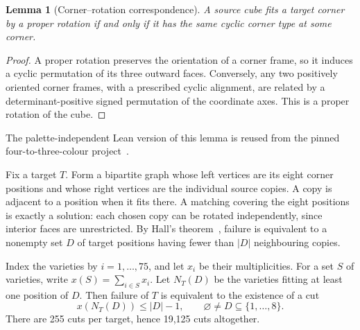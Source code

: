 \documentclass[11pt]{article}
\newtheorem{lemma}[theorem]{Lemma}
\theoremstyle{remark}
\begin{document}
\begin{lemma}[Corner--rotation correspondence]\label{lem:corner}
A source cube fits a target corner by a proper rotation if and only if it
has the same cyclic corner type at some corner.
\end{lemma}
\begin{proof}
A proper rotation preserves the orientation of a corner frame, so it induces
a cyclic permutation of its three outward faces. Conversely, any two
positively oriented corner frames, with a prescribed cyclic alignment,
are related by a determinant-positive signed permutation of the coordinate
axes. This is a proper rotation of the cube.
\end{proof}
The palette-independent Lean version of this lemma is reused from the
pinned four-to-three-colour project~\cite{FourToThree}.

Fix a target $T$. Form a bipartite graph whose left vertices are its eight
corner positions and whose right vertices are the individual source copies.
A copy is adjacent to a position when it fits there. A matching covering
the eight positions is exactly a solution: each chosen copy can be rotated
independently, since interior faces are unrestricted. By Hall's
theorem~\cite{Hall}, failure is equivalent to a nonempty set $D$ of target
positions having fewer than $|D|$ neighbouring copies.

Index the varieties by $i=1,\ldots,75$, and let $x_i$ be their multiplicities.
For a set $S$ of varieties, write $x(S)=\sum_{i\in S}x_i$.
Let $N_T(D)$ be the varieties fitting at least one position of $D$. Then
failure of $T$ is equivalent to the existence of a cut
\begin{equation}\label{eq:hall}
  x(N_T(D))\le |D|-1,\qquad \varnothing\ne D\subseteq\{1,\ldots,8\}.
\end{equation}
There are 255 cuts per target, hence 19,125 cuts altogether.
\end{document}
